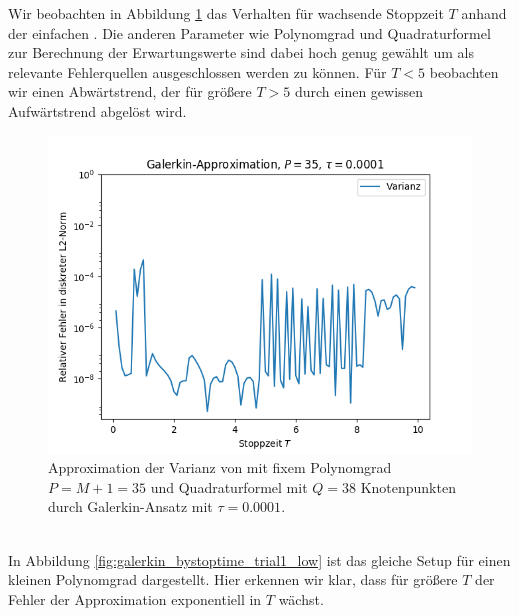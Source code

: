 Wir beobachten in Abbildung \ref{fig:galerkin_bystoptime_trial1} das Verhalten für wachsende Stoppzeit $T$ anhand der einfachen . Die anderen Parameter wie Polynomgrad und Quadraturformel zur Berechnung der Erwartungswerte sind dabei hoch genug gewählt um als relevante Fehlerquellen ausgeschlossen werden zu können. Für $T<5$ beobachten wir einen Abwärtstrend, der für größere $T>5$ durch einen gewissen Aufwärtstrend abgelöst wird.
\begin{figure}[!htb]
\centering
\includegraphics[width=0.75\linewidth]{Figures/galerkin_bystoptime_trial1_fixedhighdegree.png}
\caption{Approximation der Varianz von  mit fixem Polynomgrad $P=M+1=35$ und Quadraturformel mit $Q=38$ Knotenpunkten durch Galerkin-Ansatz mit $\tau=0.0001$.}
\label{fig:galerkin_bystoptime_trial1}
\end{figure}\\
In Abbildung \ref{fig:galerkin_bystoptime_trial1_low} ist das gleiche Setup für einen kleinen Polynomgrad dargestellt. Hier erkennen wir klar, dass für größere $T$ der Fehler der Approximation exponentiell in $T$ wächst.\\
